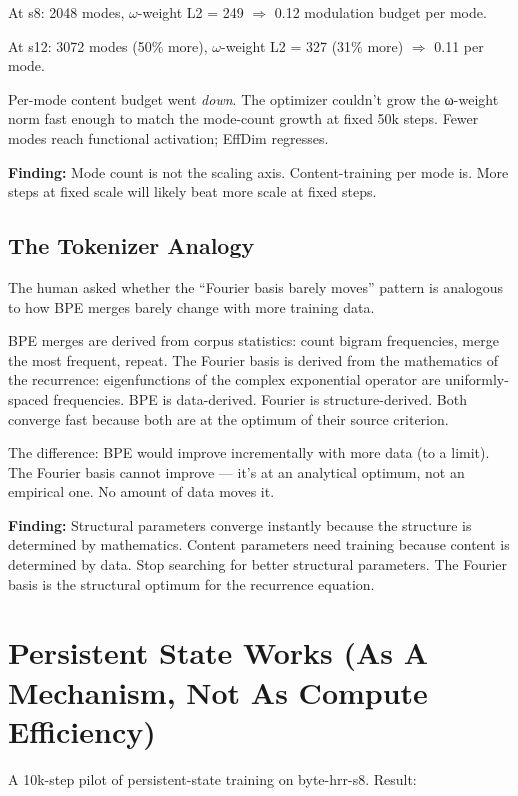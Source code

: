 \documentclass[11pt,a4paper]{report}
\newcommand{\finding}[1]{\textcolor{finding}{\textbf{Finding:}} #1}
\begin{document}
At s8: 2048 modes, $\omega$-weight L2 = 249 $\Rightarrow$ 0.12 modulation budget per mode.

At s12: 3072 modes (50\% more), $\omega$-weight L2 = 327 (31\% more) $\Rightarrow$ 0.11 per mode.

Per-mode content budget went \emph{down}. The optimizer couldn't grow the ω-weight norm fast enough to match the mode-count growth at fixed 50k steps. Fewer modes reach functional activation; EffDim regresses.

\finding{Mode count is not the scaling axis. Content-training per mode is. More steps at fixed scale will likely beat more scale at fixed steps.}

\section{The Tokenizer Analogy}

The human asked whether the ``Fourier basis barely moves'' pattern is analogous to how BPE merges barely change with more training data.

BPE merges are derived from corpus statistics: count bigram frequencies, merge the most frequent, repeat. The Fourier basis is derived from the mathematics of the recurrence: eigenfunctions of the complex exponential operator are uniformly-spaced frequencies. BPE is data-derived. Fourier is structure-derived. Both converge fast because both are at the optimum of their source criterion.

The difference: BPE would improve incrementally with more data (to a limit). The Fourier basis cannot improve --- it's at an analytical optimum, not an empirical one. No amount of data moves it.

\finding{Structural parameters converge instantly because the structure is determined by mathematics. Content parameters need training because content is determined by data. Stop searching for better structural parameters. The Fourier basis is the structural optimum for the recurrence equation.}


\chapter{Persistent State Works (As A Mechanism, Not As Compute Efficiency)}

A 10k-step pilot of persistent-state training on byte-hrr-s8. Result:
\end{document}
